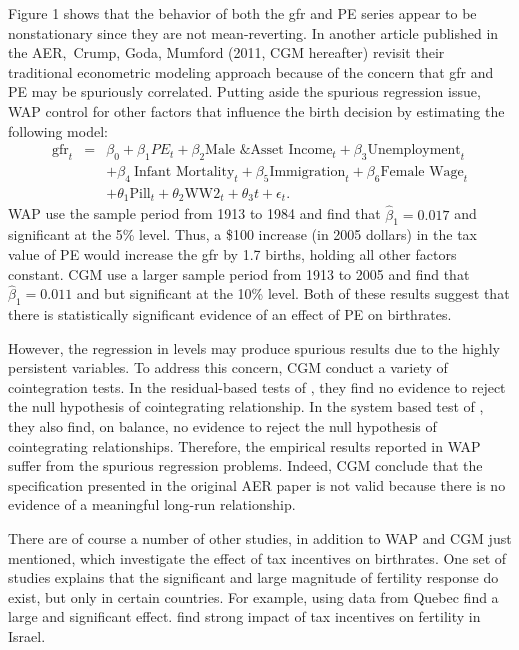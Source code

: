 \documentclass[12pt,a4paper]{article}
\begin{document}
Figure 1 shows that the behavior of both the gfr and PE series appear to be nonstationary since they are not mean-reverting. In another article published in the AER,\textit{\ }Crump, Goda, Mumford (2011, CGM hereafter) revisit their traditional econometric modeling approach
because of the concern that gfr and PE may be spuriously correlated. Putting
aside the spurious regression issue, WAP control for other factors that
influence the birth decision by estimating the following model:%
\begin{eqnarray}
\text{gfr}_{t} &=&\beta _{0}+\beta _{1}PE_{t}+\beta _{2}\text{Male \& Asset Income}%
_{t}+\beta _{3}\text{Unemployment}_{t}  \label{bigModel} \\
&&+\beta _{4}\ \text{Infant Mortality}_{t}+\beta _{5}\text{Immigration}%
_{t}+\beta _{6}\text{Female Wage}_{t}  \nonumber \\
&&+\theta _{1}\text{Pill}_{t}+\theta _{2}\text{WW2}_{t}+\theta
_{3}t+\epsilon _{t}.  \nonumber
\end{eqnarray}
WAP use the sample period from 1913 to 1984 and find that $\hat{\beta}%
_{1}=0.017$ and significant at the 5\% level. Thus, a \$100 increase (in
2005 dollars) in the tax value of PE would increase the gfr by 1.7 births,
holding all other factors constant. CGM use a larger sample period from 1913
to 2005 and find that $\hat{\beta}_{1}=0.011$ and but significant at the
10\% level. Both of these results suggest that there is statistically
significant evidence of an effect of PE on birthrates. 

However, the regression in levels may produce spurious results due to the highly
persistent variables. To address this concern, CGM conduct a variety of cointegration tests. In the residual-based tests of \cite{arai2007testing}, they find no evidence to reject the null
hypothesis of cointegrating relationship. In the system based test of
\cite{saikkonen2000testing}, they also find, on balance, no evidence to
reject the null hypothesis of cointegrating relationships. Therefore, the empirical results reported in WAP suffer from the spurious regression problems. Indeed, CGM conclude that the specification presented in the original AER paper is not valid because there is no evidence of a meaningful long-run relationship.

There are of course a number of other studies, in addition to WAP and CGM
just mentioned, which investigate the effect of tax incentives on
birthrates. One set of studies explains that the significant and large
magnitude of fertility response do exist, but only in certain countries. For
example, using data from Quebec \cite{milligan2005subsidizing} find a large and significant effect. \cite{cohen2013financial} find strong impact of tax incentives
on fertility in Israel. 
\end{document}
